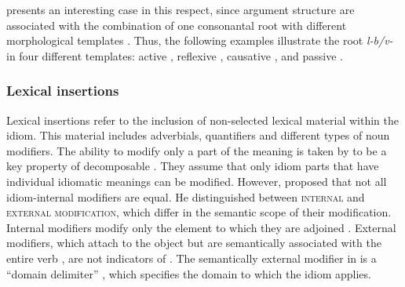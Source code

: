 \documentclass[output=paper]{langsci/langscibook}
\begin{document}
 presents an interesting case in this respect, since argument structure  are associated with the combination of one consonantal root with different
morphological templates \citep{doron08,doron03agency}. Thus, the following examples illustrate the root \textit{l-b/v-{\shin}} in four different templates: active , reflexive , causative , and passive .
\eal
\zl


\subsubsection{Lexical insertions}

Lexical insertions refer to the inclusion of non-selected lexical material within the idiom. This material includes adverbials, quantifiers and different types of noun modifiers.
The ability to modify only a part of the meaning is taken by
\citet{nunberg94} to be a key property of decomposable
. They assume that only idiom parts that have individual idiomatic meanings can be modified.
However, \citet{ernst81} proposed that not all idiom-internal modifiers are equal. He distinguished between {\scshape internal} and {\scshape external modification}, which differ in the semantic scope of their modification. Internal modifiers modify only the element to which they are adjoined . External modifiers, which attach to the object but
are semantically associated with the entire verb , are not indicators of . The semantically external modifier in  is a ``domain delimiter'' \citep{ernst81}, which specifies the domain to which the idiom applies.
\end{document}
